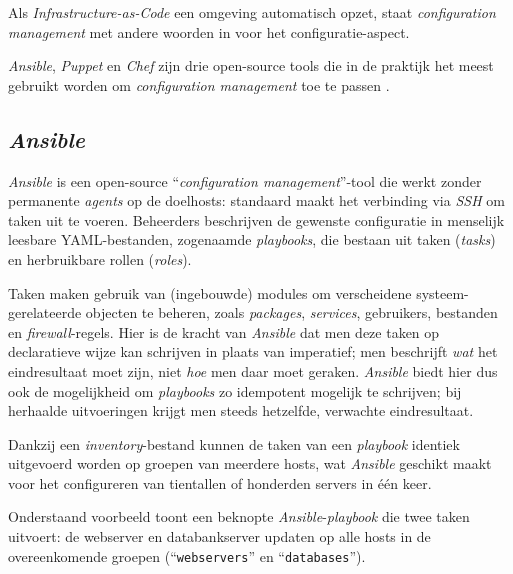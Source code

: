 Als \emph{Infrastructure-as-Code} een omgeving automatisch opzet, staat \emph{configuration management} met andere woorden in voor het configuratie-aspect.

\emph{Ansible}, \emph{Puppet} en \emph{Chef} zijn drie open-source tools die in de praktijk het meest gebruikt worden om \emph{configuration management} toe te passen \autocite{Masek2018}.

\subsection{\emph{Ansible}}%

\emph{Ansible} is een open-source ``\emph{configuration management}''-tool die werkt zonder permanente \emph{agents} op de doelhosts: standaard maakt het verbinding via \emph{SSH} om taken uit te voeren.
Beheerders beschrijven de gewenste configuratie in menselijk leesbare YAML-bestanden, zogenaamde \emph{playbooks}, die bestaan uit taken (\emph{tasks}) en herbruikbare rollen (\emph{roles}). \autocite{Ansible2025}

Taken maken gebruik van (ingebouwde) modules om verscheidene systeem-gerelateerde objecten te beheren, zoals \emph{packages}, \emph{services}, gebruikers, bestanden en \emph{firewall}-regels.
Hier is de kracht van \emph{Ansible} dat men deze taken op declaratieve wijze kan schrijven in plaats van imperatief; men beschrijft \emph{wat} het eindresultaat moet zijn, niet \emph{hoe} men daar moet geraken. \emph{Ansible} biedt hier dus ook de mogelijkheid om \emph{playbooks} zo idempotent mogelijk te schrijven; bij herhaalde uitvoeringen krijgt men steeds hetzelfde, verwachte eindresultaat. \autocite{Stoeckl2025}

Dankzij een \emph{inventory}-bestand kunnen de taken van een \emph{playbook} identiek uitgevoerd worden op groepen van meerdere hosts, wat \emph{Ansible} geschikt maakt voor het configureren van tientallen of honderden servers in één keer. \autocite{Ansible2025}

Onderstaand voorbeeld toont een beknopte \emph{Ansible}-\emph{playbook} die twee taken uitvoert: de webserver en databankserver updaten op alle hosts in de overeenkomende groepen (``\texttt{webservers}'' en ``\texttt{databases}'').

